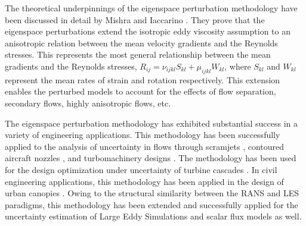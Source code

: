 The theoretical underpinnings of the eigenspace perturbation methodology have been discussed in detail by Mishra and Iaccarino \cite{mishra_perturbations_2019}. They prove that the eigenspace perturbations extend the isotropic eddy viscosity assumption to an anisotropic relation between the mean velocity gradients and the Reynolds stresses. This represents the most general relationship between the mean gradients and the Reynolds stresses, $ R_{ij}=\nu_{ijkl}S_{kl}+\mu_{ijkl}W_{kl}$, where $S_{kl}$ and $W_{kl}$ represent the mean rates of strain and rotation respectively. This extension enables the perturbed models to account for the effects of flow separation, secondary flows, highly anisotropic flows, etc. 

The eigenspace perturbation methodology has exhibited substantial success in a variety of engineering applications. This methodology has been successfully applied to the analysis of uncertainty in flows through scramjets \cite{emory2011characterizing}, contoured aircraft nozzles \cite{aiaajets, envelopingmodels}, and turbomachinery designs \cite{emory2016uncertainty}. The methodology has been used for the design optimization under uncertainty of turbine cascades \cite{razaaly2019optimization}. In civil engineering applications, this methodology has been applied in the design of urban canopies \cite{garcia2014quantifying,ricci2015local}. Owing to the structural similarity between the RANS and LES paradigms, this methodology has been extended and successfully applied for the uncertainty estimation of Large Eddy Simulations and scalar flux models \cite{gorle2013framework} as well.


